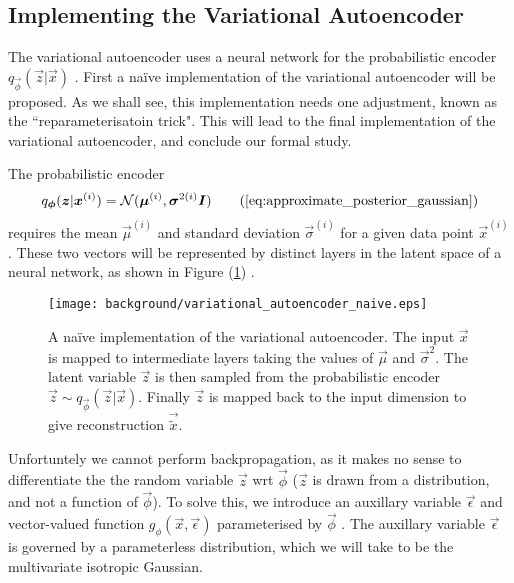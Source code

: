 \subsection{Implementing the Variational Autoencoder}

The variational autoencoder uses a neural network for the probabilistic encoder $q_{\vec{\phi}}(\vec{z}|\vec{x})$ \cite{Kingma2014}. First a na\"{i}ve implementation of the variational autoencoder will be proposed. As we shall see, this implementation needs one adjustment, known as the ``reparameterisatoin trick". This will lead to the final implementation of the variational autoencoder, and conclude our formal study.

The probabilistic encoder
\begin{align}
q_{\vec{\phi}}(\vec{z} | \vec{x}^{(i)}) = \mathcal{N}(\vec{\mu}^{(i)}, \vec{\sigma}^{2(i)}\vec{I})
\tag{\ref{eq:approximate_posterior_gaussian}}
\end{align}
requires the mean $\vec{\mu}^{(i)}$ and standard deviation $\vec{\sigma}^{(i)}$ for a given data point $\vec{x}^{(i)}$. These two vectors will be represented by distinct layers in the latent space of a neural network, as shown in Figure (\ref{fig:variational_autoencoder_naive}) \cite{Li2016}.\\

\begin{figure}[h!]
\centering
\captionsetup{justification=centering}
\texttt{[image: background/variational\_autoencoder\_naive.eps]}
\caption{A na\"{i}ve implementation of the variational autoencoder. The input $\vec{x}$ is mapped to intermediate layers taking the values of $\vec{\mu}$ and $\vec{\sigma}^2$. The latent variable $\vec{z}$ is then sampled from the probabilistic encoder $\vec{z} \sim q_{\vec{\phi}}(\vec{z} | \vec{x})$. Finally $\vec{z}$ is mapped back to the input dimension to give reconstruction $\vec{\tilde{x}}$.}
\label{fig:variational_autoencoder_naive}
\end{figure}

Unfortuntely we cannot perform backpropagation, as it makes no sense to differentiate the the random variable $\vec{z}$ wrt $\vec{\phi}$ ($\vec{z}$ is drawn from a distribution, and not a function of $\vec{\phi}$). To solve this, we introduce an auxillary variable $\vec{\epsilon}$ and vector-valued function $g_{\phi}(\vec{x}, \vec{\epsilon})$ parameterised by $\vec{\phi}$ \cite{Kingma2014}. The auxillary variable $\vec{\epsilon}$ is governed by a parameterless distribution, which we will take to be the multivariate isotropic Gaussian.

